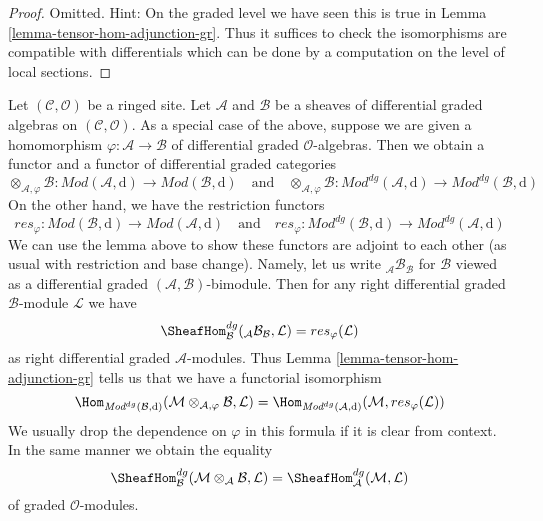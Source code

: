 \begin{proof}
Omitted. Hint: On the graded level we have seen this is true in
Lemma \ref{lemma-tensor-hom-adjunction-gr}. Thus it suffices
to check the isomorphisms are compatible with differentials
which can be done by a computation on the level of local sections.
\end{proof}

\noindent
Let $(\mathcal{C}, \mathcal{O})$ be a ringed site. Let $\mathcal{A}$
and $\mathcal{B}$ be a sheaves of differential graded algebras on
$(\mathcal{C}, \mathcal{O})$.
As a special case of the above, suppose we are given
a homomorphism $\varphi : \mathcal{A} \to \mathcal{B}$
of differential graded $\mathcal{O}$-algebras. Then we obtain a functor
and a functor of differential graded categories
$$
\otimes_{\mathcal{A}, \varphi} \mathcal{B} :
\textit{Mod}(\mathcal{A}, \text{d})
\longrightarrow
\textit{Mod}(\mathcal{B}, \text{d})
\quad\text{and}\quad
\otimes_{\mathcal{A}, \varphi} \mathcal{B} :
\textit{Mod}^{dg}(\mathcal{A}, \text{d})
\longrightarrow
\textit{Mod}^{dg}(\mathcal{B}, \text{d})
$$
On the other hand, we have the restriction functors
$$
res_\varphi :
\textit{Mod}(\mathcal{B}, \text{d})
\longrightarrow
\textit{Mod}(\mathcal{A}, \text{d})
\quad\text{and}\quad
res_\varphi :
\textit{Mod}^{dg}(\mathcal{B}, \text{d})
\longrightarrow
\textit{Mod}^{dg}(\mathcal{A}, \text{d})
$$
We can use the lemma above to show these functors are adjoint to
each other (as usual with restriction and base change). Namely,
let us write ${}_\mathcal{A}\mathcal{B}_\mathcal{B}$ for
$\mathcal{B}$ viewed as a differential graded
$(\mathcal{A}, \mathcal{B})$-bimodule.
Then for any right differential graded $\mathcal{B}$-module $\mathcal{L}$
we have
$$
\SheafHom_\mathcal{B}^{dg}({}_\mathcal{A}\mathcal{B}_\mathcal{B}, \mathcal{L})
= res_\varphi(\mathcal{L})
$$
as right differential graded $\mathcal{A}$-modules. Thus
Lemma \ref{lemma-tensor-hom-adjunction-gr}
tells us that we have a functorial isomorphism
$$
\Hom_{\textit{Mod}^{dg}(\mathcal{B}, \text{d})}(
\mathcal{M} \otimes_{\mathcal{A}, \varphi} \mathcal{B}, \mathcal{L}) =
\Hom_{\textit{Mod}^{dg}(\mathcal{A}, \text{d})}(
\mathcal{M}, res_\varphi(\mathcal{L}))
$$
We usually drop the dependence on $\varphi$ in this formula if it
is clear from context. In the same manner we obtain
the equality
$$
\SheafHom^{dg}_\mathcal{B}(
\mathcal{M} \otimes_\mathcal{A} \mathcal{B}, \mathcal{L}) =
\SheafHom_\mathcal{A}^{dg}(\mathcal{M}, \mathcal{L})
$$
of graded $\mathcal{O}$-modules.












